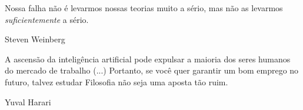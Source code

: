 \documentclass[./main.tex]{subfiles}
\begin{document}
\newpage
\renewcommand{\headrulewidth}{0pt}
\thispagestyle{fancy}
\fancyhf{} %
\fancyfoot{} %
\fancyfoot[C]{\thepage}

\epigraph{Nossa falha não é levarmos nossas teorias muito a sério, mas não as levarmos \textit{suficientemente} a sério.}{Steven Weinberg}

\epigraph{A ascensão da inteligência artificial pode expulsar a maioria dos seres humanos do mercado de trabalho (...) Portanto, se você quer garantir um bom emprego no futuro, talvez estudar Filosofia não seja uma aposta tão ruim.}{Yuval Harari}


\clearpage
\end{document}
